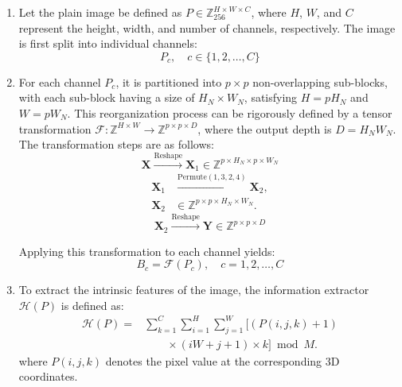 \documentclass[10pt,twocolumn]{article}
\theoremstyle{definition}
\begin{document}
\begin{enumerate}
	\item 
	Let the plain image be defined as $P \in \mathbb{Z}^{H \times W \times C}_{256}$, where $H$, $W$, and $C$ represent the height, width, and number of channels, respectively. The image is first split into individual channels:
	\begin{equation}
		P_c, \quad c \in \{1, 2, \dots, C\}
	\end{equation}

\item
For each channel $P_c$, it is partitioned into $p \times p$ non-overlapping sub-blocks, with each sub-block having a size of $H_N \times W_N$, satisfying $H = p H_N$ and $W = p W_N$. This reorganization process can be rigorously defined by a tensor transformation $\mathcal{F}: \mathbb{Z}^{H \times W} \to \mathbb{Z}^{p \times p \times D}$, where the output depth is $D = H_N W_N$. The transformation steps are as follows:
\begin{equation}
	\mathbf{X} \xrightarrow{\text{Reshape}} \mathbf{X}_1 \in \mathbb{Z}^{p \times H_N \times p \times W_N}
\end{equation}
\begin{equation}
\begin{aligned}
\mathbf{X}_1
&\xrightarrow{\mathrm{Permute}(1,3,2,4)}\mathbf{X}_2,\\
\mathbf{X}_2
&\in\mathbb{Z}^{p\times p\times H_N\times W_N}.
\end{aligned}
\end{equation}
\begin{equation}
	\mathbf{X}_2 \xrightarrow{\text{Reshape}} \mathbf{Y} \in \mathbb{Z}^{p \times p \times D}
\end{equation}

Applying this transformation to each channel yields:
\begin{equation}
	B_c = \mathcal{F}(P_c), \quad c = 1, 2, \dots, C
\end{equation}

\item
To extract the intrinsic features of the image, the information extractor $\mathcal{H}(P)$ is defined as:
\begin{equation}
\begin{aligned}
\mathcal{H}(P)
={}&\sum_{k=1}^{C}\sum_{i=1}^{H}\sum_{j=1}^{W}
\bigl[(P(i,j,k)+1)\\
&\qquad\times(iW+j+1)\times k\bigr]\bmod M.
\end{aligned}
\end{equation}
where $P(i,j,k)$ denotes the pixel value at the corresponding 3D coordinates.


\end{enumerate}
\end{document}
